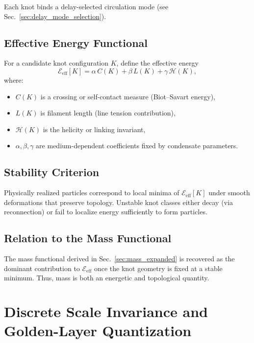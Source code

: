 \documentclass[10pt]{article}
\begin{document}
Each knot binds a delay-selected circulation mode (see Sec.~\ref{sec:delay_mode_selection}).

\subsection{Effective Energy Functional}

For a candidate knot configuration $K$, define the effective energy
\begin{equation}
    \mathcal{E}_{\mathrm{eff}}[K]
    =
    \alpha\,C(K)
    + \beta\,L(K)
    + \gamma\,\mathcal{H}(K),
\end{equation}
where:
\begin{itemize}
    \item $C(K)$ is a crossing or self-contact measure (Biot--Savart energy),
    \item $L(K)$ is filament length (line tension contribution),
    \item $\mathcal{H}(K)$ is the helicity or linking invariant,
    \item $\alpha,\beta,\gamma$ are medium-dependent coefficients fixed by
    condensate parameters.
\end{itemize}

\subsection{Stability Criterion}

Physically realized particles correspond to local minima of
$\mathcal{E}_{\mathrm{eff}}[K]$ under smooth deformations that preserve topology.
Unstable knot classes either decay (via reconnection) or fail to localize
energy sufficiently to form particles.

\subsection{Relation to the Mass Functional}

The mass functional derived in Sec.~\ref{sec:mass_expanded} is recovered as the
dominant contribution to $\mathcal{E}_{\mathrm{eff}}$ once the knot geometry
is fixed at a stable minimum. Thus, mass is both an energetic and topological
quantity.

    \section{Discrete Scale Invariance and Golden-Layer Quantization}
    \label{sec:golden}
\end{document}
